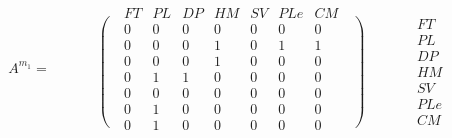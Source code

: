 \begin{equation*}
A^{m_1}=\begin{matrix}\text{ }\\\left.\phantom{\begin{matrix}\mathit{FT}\\\mathit{PL}\\\mathit{DP}\\\mathit{HM}\\\mathit{SV}\\\mathit{PLe}\\\mathit{CM}\end{matrix}}\right(\end{matrix}\begin{matrix}\mathit{FT}&\mathit{PL}&\mathit{DP}&\mathit{HM}&\mathit{SV}&\mathit{PLe}&\mathit{CM}\\0&0&0&0&0&0&0\\0&0&0&1&0&1&1\\0&0&0&1&0&0&0\\0&1&1&0&0&0&0\\0&0&0&0&0&0&0\\0&1&0&0&0&0&0\\0&1&0&0&0&0&0\end{matrix}\begin{matrix}\text{ }\\\left)\phantom{\begin{matrix}\mathit{FT}\\\mathit{PL}\\\mathit{DP}\\\mathit{HM}\\\mathit{SV}\\\mathit{PLe}\\\mathit{CM}\end{matrix}}\right.\end{matrix}\begin{matrix}\text{ }\\\mathit{FT}\\\mathit{PL}\\\mathit{DP}\\\mathit{HM}\\\mathit{SV}\\\mathit{PLe}\\\mathit{CM}\end{matrix}
\end{equation*}

\bigskip

